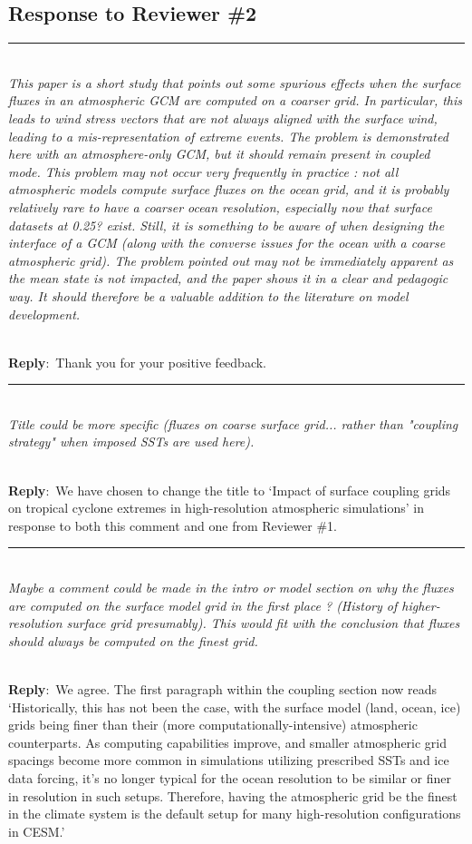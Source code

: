 \documentclass{article}
\newcommand{\genDisc}[1]{\medskip \hrule \noindent \\
               {\itshape #1}}
\newcommand{\reply}{\noindent \\ \textbf{Reply}:\ }
\begin{document}
\subsection*{Response to Reviewer \#2}

\genDisc{This paper is a short study that points out some spurious effects when the surface fluxes in an atmospheric GCM are computed on a coarser grid. In particular, this leads to wind stress vectors that are not always aligned with the surface wind, leading to a mis-representation of extreme events. The problem is demonstrated here with an atmosphere-only GCM, but it should remain present in coupled mode. This problem may not occur very frequently in practice : not all atmospheric models compute surface fluxes on the ocean grid, and it is probably relatively rare to have a coarser ocean resolution, especially now that surface datasets at 0.25? exist. Still, it is something to be aware of when designing the interface of a GCM (along with the converse issues for the ocean with a coarse atmospheric grid). The problem pointed out may not be immediately apparent as the mean state is not impacted, and the paper shows it in a clear and pedagogic way. It should therefore be a valuable addition to the literature on model development.}

\reply{Thank you for your positive feedback.}

\genDisc{Title could be more specific (fluxes on coarse surface grid... rather than "coupling strategy" when imposed SSTs are used here).}

\reply{We have chosen to change the title to `Impact of surface coupling grids on tropical cyclone extremes in high-resolution atmospheric simulations' in response to both this comment and one from Reviewer \#1.}

\genDisc{Maybe a comment could be made in the intro or model section on why the fluxes are computed on the surface model grid in the first place ? (History of higher-resolution surface grid presumably). This would fit with the conclusion that fluxes should always be computed on the finest grid.}

\reply{We agree. The first paragraph within the coupling section now reads `Historically, this has not been the case, with the surface model (land, ocean, ice) grids being finer than their (more computationally-intensive) atmospheric counterparts. As computing capabilities improve, and smaller atmospheric grid spacings become more common in simulations utilizing prescribed SSTs and ice data forcing, it's no longer typical for the ocean resolution to be similar or finer in resolution in such setups. Therefore, having the atmospheric grid be the finest in the climate system is the default setup for many high-resolution configurations in CESM.'}
\end{document}
